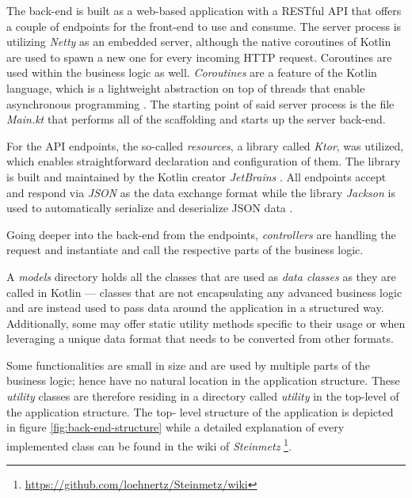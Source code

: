 \documentclass[12pt,a4paper]{report}
\begin{document}
The back-end is built as a web-based application with a RESTful API that offers
a couple of endpoints for the front-end to use and consume. The server process
is utilizing \textit{Netty} \cite{ktor-netty} as an embedded server, although
the native coroutines of Kotlin are used to spawn a new one for every incoming
HTTP request. Coroutines are used within the business logic as
well. \textit{Coroutines} are a feature of the Kotlin language, which is a
lightweight abstraction on top of threads that enable asynchronous programming
\cite{kotlin-coroutines}. The starting point of said server process is the file
\textit{Main.kt} that performs all of the scaffolding and starts up the server
back-end.

For the API endpoints, the so-called \textit{resources}, a library called
\textit{Ktor}, was utilized, which enables straightforward declaration and
configuration of them. The library is built and maintained by the Kotlin
creator \textit{JetBrains} \cite{ktor}. All endpoints accept and respond via
\textit{JSON} as the data exchange format while the library \textit{Jackson} is
used to automatically serialize and deserialize JSON data \cite{ktor-jackson}.

Going deeper into the back-end from the endpoints, \textit{controllers} are
handling the request and instantiate and call the respective parts of the
business logic.

A \textit{models} directory holds all the classes that are used as
\textit{data classes} as they are called in Kotlin --- classes that are not
encapsulating any advanced business logic and are instead used to pass data
around the application in a structured way. Additionally, some may offer static
utility methods specific to their usage or when leveraging a unique data format
that needs to be converted from other formats.

Some functionalities are small in size and are used by multiple parts
of the business logic; hence have no natural location in the application
structure. These \textit{utility} classes are therefore residing in a directory
called \textit{utility} in the top-level of the application structure. The top\hyp
level structure of the application is depicted in figure
\ref{fig:back-end-structure} while a detailed explanation of every implemented
class can be found in the wiki of \textit{Steinmetz}
\footnote{\url{https://github.com/loehnertz/Steinmetz/wiki}}.
\end{document}

